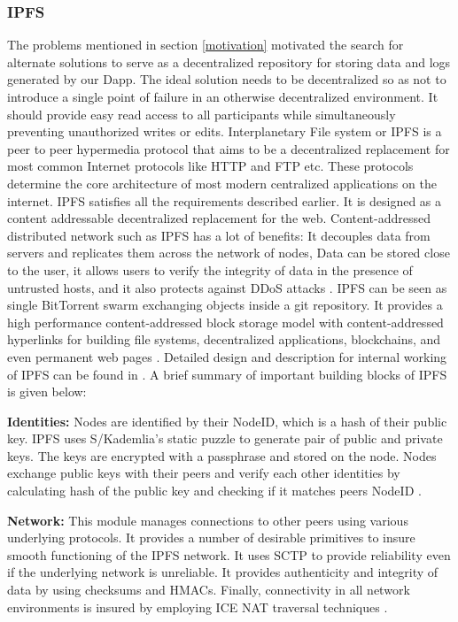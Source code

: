 \subsubsection{IPFS}

The problems mentioned in section \ref{motivation} motivated the search for alternate solutions to serve as a decentralized repository for storing data and logs generated by our Dapp. The ideal solution needs to be decentralized so as not to introduce a single point of failure in an otherwise decentralized environment. It should provide easy read access to all participants while simultaneously preventing unauthorized writes or edits. Interplanetary File system or IPFS \cite{DBLP:journals/corr/Benet14} is a peer to peer hypermedia protocol that aims to be a decentralized replacement for most common Internet protocols like HTTP and FTP etc. These protocols determine the core architecture of most modern centralized applications on the internet. IPFS satisfies all the requirements described earlier.  It is designed as a content addressable decentralized replacement for the web. Content-addressed distributed network such as IPFS has a lot of benefits: It decouples data from servers and replicates them across the network of nodes, Data can be stored close to the user, it allows users to verify the integrity of data in the presence of untrusted hosts, and it also protects against DDoS attacks \cite{DBLP:journals/corr/Benet14}. IPFS can be seen as single BitTorrent swarm exchanging objects inside a git repository. It provides a high performance content-addressed block storage model with content-addressed hyperlinks for building file systems, decentralized applications, blockchains, and even permanent web pages \cite{DBLP:journals/corr/Benet14}. Detailed design and description for internal working of IPFS can be found in \cite{DBLP:journals/corr/Benet14}. A brief summary of important building blocks of IPFS is given below:

\textbf{Identities:} Nodes are identified by their NodeID, which is a hash of their public key. IPFS uses S/Kademlia’s static puzzle to generate pair of public and private keys. The keys are encrypted with a passphrase and stored on the node. Nodes exchange public keys with their peers and verify each other identities by calculating hash of the public key and checking if it matches peers NodeID \cite{DBLP:journals/corr/Benet14}.

\textbf{Network:} This module manages connections to other peers using various underlying protocols. It provides a number of desirable primitives to insure smooth functioning of the IPFS network. It uses SCTP to provide reliability even if the underlying network is unreliable. It provides authenticity and integrity of data by using checksums and HMACs. Finally, connectivity in all network environments is insured by employing ICE NAT traversal techniques \cite{DBLP:journals/corr/Benet14}.

